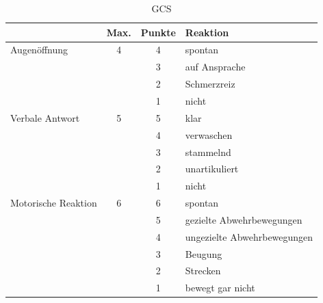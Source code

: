 \begin{table}[H]\begin{center}
\begin{tabulary}{\linewidth}{LCCL}
\toprule
~ & Max. & Punkte & Reaktion
\\\midrule
Augen\"offnung & 4 & 4 & spontan
\\
 & & 3 & auf Ansprache
\\
 & & 2 & Schmerzreiz
\\
 & & 1 & nicht
\\\midrule
Verbale Antwort & 5 & 5 & klar
\\
 & & 4 & verwaschen
\\
 & & 3 & stammelnd
\\
 & & 2 & unartikuliert
\\
 & & 1 & nicht
\\\midrule
Motorische Reaktion & 6 & 6 & spontan
\\
 & & 5 & gezielte Abwehrbewegungen
\\
 & & 4 & ungezielte Abwehrbewegungen
\\
 & & 3 & Beugung
\\
 & & 2 & Strecken
\\
 & & 1  & bewegt gar nicht
\\\bottomrule
\end{tabulary}\end{center}
\caption{GCS}
\end{table}



